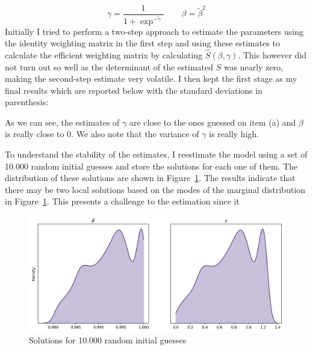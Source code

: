 \documentclass[12pt,twoside]{article}
\begin{document}
\begin{enumerate}[label = \Alph*)]
\begin{solution}
        \[
            \gamma = \frac{1}{1+\exp^{-\tilde\gamma}} \hspace{25pt} \beta = \tilde\beta^2
        \]
        Initially I tried to perform a two-step approach to estimate the parameters using the identity weighting matrix in the first step and using these estimates to calculate the efficient weighting matrix by calculating \(\widehat S(\beta,\gamma)\). This however did not turn out so well as the determinant of the estimated \(S\) was nearly zero, making the second-step estimate very volatile. I then kept the first stage as my final results which are reported below with the standard deviations in parenthesis:

        \begin{center}
            
        \end{center}

        As we can see, the estimates of \(\gamma\) are close to the ones guessed on item (a) and \(\beta\) is really close to 0. We also note that the variance of \(\gamma\) is really high.

        To understand the stability of the estimates, I reestimate the model using a set of 10.000 random initial guesses and store the solutions for each one of them. The distribution of these solutions are shown in Figure~\ref{fig:solutions}. The results indicate that there may be two local solutions based on the modes of the marginal distribution in Figure~\ref{fig:solutions}. This presents a challenge to the estimation since it 

        \begin{figure}[!htbp]
            \centering
            \includegraphics[width = \textwidth]{images/marg_solutions.jpg}
            \caption{Solutions for 10.000 random initial guesses}
            \label{fig:solutions}
        \end{figure}


\end{solution}
\end{enumerate}
\end{document}
